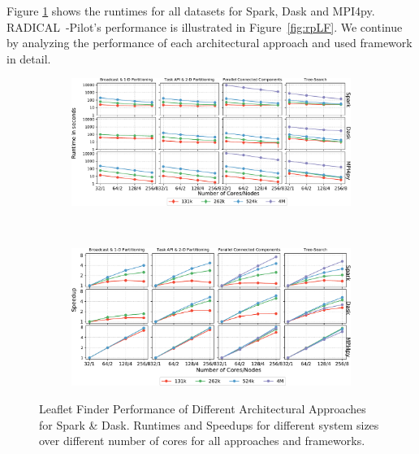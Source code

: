 Figure \ref{fig:All4approachesNoRp} shows the runtimes for all datasets for Spark, Dask and MPI4py.
RADICAL~-Pilot's performance is illustrated in Figure~\ref{fig:rpLF}.
We continue by analyzing the performance of each architectural approach and used framework in detail.

\begin{figure}[t]
    \centering
    \begin{subfigure}{.75\textwidth}
        \centering
        \includegraphics[width=1\linewidth]{figures/data_analytics_hpc/task_par/All4approachesWith4M_logscaleline.pdf}
    \end{subfigure}\\
    \begin{subfigure}{.75\textwidth}
        \centering
        \includegraphics[width=.95\linewidth]{figures/data_analytics_hpc/task_par/All4approachesWith4MSpeedup.pdf}
    \end{subfigure}
    \caption{Leaflet Finder Performance of Different Architectural Approaches for Spark \& Dask.
            Runtimes and Speedups for different system sizes over different number of cores for all approaches and frameworks.}
    \label{fig:All4approachesNoRp}
\end{figure}


